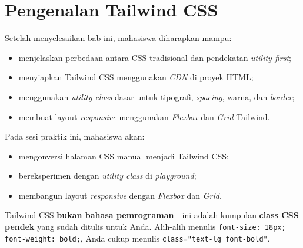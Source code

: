 
\chapter{Pengenalan Tailwind CSS}
\label{chap:mjs-12}

\begin{capaian}
Setelah menyelesaikan bab ini, mahasiswa diharapkan mampu:
\begin{itemize}
  \item menjelaskan perbedaan antara CSS tradisional dan pendekatan \emph{utility-first};
  \item menyiapkan Tailwind CSS menggunakan \emph{CDN} di proyek HTML;
  \item menggunakan \emph{utility class} dasar untuk tipografi, \emph{spacing}, warna, dan \emph{border};
  \item membuat layout \emph{responsive} menggunakan \emph{Flexbox} dan \emph{Grid} Tailwind.
\end{itemize}
\end{capaian}

\begin{tujuanpraktik}
Pada sesi praktik ini, mahasiswa akan:
\begin{itemize}
  \item mengonversi halaman CSS manual menjadi Tailwind CSS;
  \item bereksperimen dengan \emph{utility class} di \emph{playground};
  \item membangun layout \emph{responsive} dengan \emph{Flexbox} dan \emph{Grid}.
\end{itemize}
\end{tujuanpraktik}

\begin{catatan}
Tailwind CSS \textbf{bukan bahasa pemrograman}---ini adalah kumpulan \textbf{class CSS pendek} yang sudah ditulis untuk Anda. Alih-alih menulis \texttt{font-size: 18px; font-weight: bold;}, Anda cukup menulis \texttt{class="text-lg font-bold"}.
\end{catatan}

